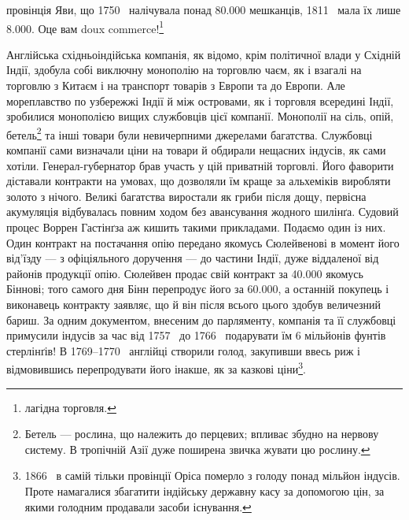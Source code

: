 \parcont{}  %
провінція Яви, що 1750~ налічувала понад \num{80.000} мешканців,
1811~ мала їх лише \num{8.000}. Оце вам doux commerce!\footnote*{
лагідна торговля. 
}

Англійська східньоіндійська компанія, як відомо, крім політичної
влади у Східній Індії, здобула собі виключну монополію
на торговлю чаєм, як і взагалі на торговлю з Китаєм і на транспорт
товарів з Европи та до Европи. Але мореплавство по узбережжі
Індії й між островами, як і торговля всередині Індії,
зробилися монополією вищих службовців цієї компанії. Монополії
на сіль, опій, бетель\footnote*{
Бетель — рослина, що належить до перцевих; впливає збудно на
нервову систему. В тропічній Азії дуже поширена звичка жувати цю рослину.
} та інші товари були невичерпними
джерелами багатства. Службовці компанії сами визначали ціни
на товари й обдирали нещасних індусів, як сами хотіли. Генерал-губернатор
брав участь у цій приватній торговлі. Його фаворити
діставали контракти на умовах, що дозволяли їм краще за альхеміків
виробляти золото з нічого. Великі багатства виростали
як гриби після дощу, первісна акумуляція відбувалась повним
ходом без авансування жодного шилінґа. Судовий процес Воррен
Гастінґза аж кишить такими прикладами. Подаємо один із
них. Один контракт на постачання опію передано якомусь Сюлейвенові
в момент його від’їзду — з офіціяльного доручення —
до частини Індії, дуже віддаленої від районів продукції опію.
Сюлейвен продає свій контракт за \num{40.000} якомусь
Біннові; того самого дня Бінн перепродує його за \num{60.000}, а останній покупець і виконавець контракту заявляє,
що й він після всього цього здобув величезний бариш.
За одним документом, внесеним до парляменту, компанія та її
службовці примусили індусів за час від 1757~ до 1766~ подарувати
їм 6 мільйонів фунтів стерлінґів! В 1769--1770~
англійці створили голод, закупивши ввесь риж і відмовившись
перепродувати його інакше, як за казкові ціни\footnote{
1866~ в самій тільки провінції Оріса померло з голоду понад
мільйон індусів. Проте намагалися збагатити індійську державну касу
за допомогою цін, за якими голодним продавали засоби існування.
}.

